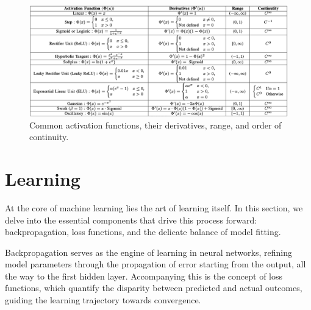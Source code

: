 \documentclass{article}
\begin{document}
\begin{figure}[b]
  \label{actfun}
  \includegraphics{ActFunTable}
\caption{Common activation functions, their derivatives, range, and order of continuity.}
\end{figure}

\newpage
\section{Learning}
  \label{sec:Learning}
  At the core of machine learning lies the art of learning itself. In this section, we delve into the essential components that drive this process forward: backpropagation, loss functions, and the delicate balance of model fitting.

Backpropagation serves as the engine of learning in neural networks, refining model parameters through the propagation of error starting from the output, all the way to the first hidden layer. Accompanying this is the concept of loss functions, which quantify the disparity between predicted and actual outcomes, guiding the learning trajectory towards convergence.
\end{document}
